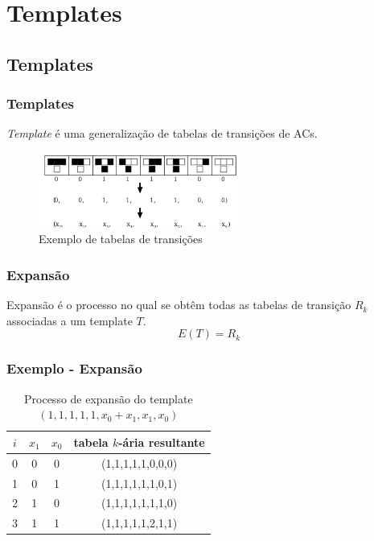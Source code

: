 \documentclass[aspectratio=43,hyperref={pdfpagelabels=false}]{beamer}
\begin{document}
\section{Templates}
\subsection*{Templates}
\begin{frame}
	\frametitle{Templates}
	
	\textit{Template} é uma generalização de tabelas de transições de ACs.
    \begin{figure}[h!]
        \centering
        \includegraphics[width=0.6\textwidth]{fig_transitionTable.pdf}
        \caption{Exemplo de tabelas de transições}
    \end{figure}
\end{frame}

    

\begin{frame}
	\frametitle{Expansão}
	Expansão é o processo no qual se obtêm todas as tabelas de transição $R_k$ associadas a um template $T$.
  \begin{equation}
  E(T)=R_k
  \end{equation}
 \end{frame}

\begin{frame}
    \frametitle{Exemplo -  Expansão}
    
  \begin{table}[h!]
  \centering
  \caption{Processo de expansão do template $(1,1,1,1,1,x_0+x_1,x_1,x_0)$}
    \begin{tabular}{cccc}
      \toprule
    $i$ & $x_1$ & $x_0$ & tabela $k$-ária resultante \\
      \midrule
    0 & 0 & 0 & (1,1,1,1,1,0,0,0) \\
    1 & 0 & 1 & (1,1,1,1,1,1,0,1) \\
    2 & 1 & 0 & (1,1,1,1,1,1,1,0) \\
    3 & 1 & 1 & (1,1,1,1,1,2,1,1) \\
      \bottomrule
      \end{tabular}
  \label{tab:invalideExpansion}
  \end{table}
\end{frame}
\end{document}
